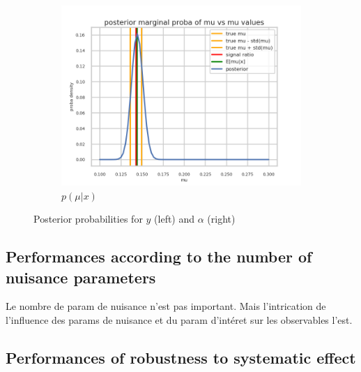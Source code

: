 \begin{figure}[htb]
  \begin{subfigure}[t]{0.49\linewidth}
    \includegraphics[width=\linewidth]{s3d2/marginal_mu.png}
    \caption{$p(\mu|x)$}
    \label{fig:marginal_mu}
  \end{subfigure}
  \caption{Posterior probabilities for $y$ (left) and $\alpha$ (right)}
  \label{fig:marginals_s3d2}
\end{figure}









\subsection{Performances according to the number of nuisance parameters} %
\label{sub:performances_according_to_the_number_of_nuisance_parameters}


Le nombre de param de nuisance n'est pas important. 
Mais l'intrication de l'influence des params de nuisance et du param d'intéret sur les observables l'est.









\subsection{Performances of robustness to systematic effect} %
\label{sub:performances_of_robustness_to_systematic_effect}


